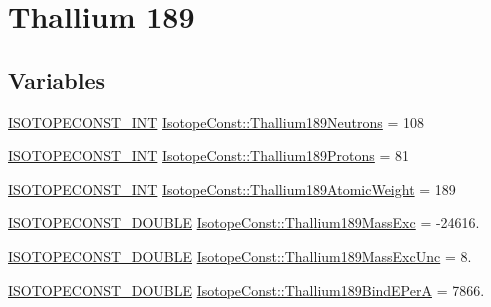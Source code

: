 \hypertarget{group___isotope_const-_thallium-_tl189}{}\section{Thallium 189}
\label{group___isotope_const-_thallium-_tl189}
\subsection*{Variables}
\begin{DoxyCompactItemize}
\item 
\mbox{\hyperlink{group___isotope_const-_macros_ga5f18360b3e99483a35c32d789e62621c}{I\+S\+O\+T\+O\+P\+E\+C\+O\+N\+S\+T\+\_\+\+I\+NT}} \mbox{\hyperlink{group___isotope_const-_thallium-_tl189_ga93f78c740e004d7b0ff4c0933b0ea2aa}{Isotope\+Const\+::\+Thallium189\+Neutrons}} = 108
\item 
\mbox{\hyperlink{group___isotope_const-_macros_ga5f18360b3e99483a35c32d789e62621c}{I\+S\+O\+T\+O\+P\+E\+C\+O\+N\+S\+T\+\_\+\+I\+NT}} \mbox{\hyperlink{group___isotope_const-_thallium-_tl189_ga1773d83e0088883eaefddce29a97cbbf}{Isotope\+Const\+::\+Thallium189\+Protons}} = 81
\item 
\mbox{\hyperlink{group___isotope_const-_macros_ga5f18360b3e99483a35c32d789e62621c}{I\+S\+O\+T\+O\+P\+E\+C\+O\+N\+S\+T\+\_\+\+I\+NT}} \mbox{\hyperlink{group___isotope_const-_thallium-_tl189_gac244129f53e660802eeed8c60e631203}{Isotope\+Const\+::\+Thallium189\+Atomic\+Weight}} = 189
\item 
\mbox{\hyperlink{group___isotope_const-_macros_ga8f45a7272ce02c0b4c65c44636ed719a}{I\+S\+O\+T\+O\+P\+E\+C\+O\+N\+S\+T\+\_\+\+D\+O\+U\+B\+LE}} \mbox{\hyperlink{group___isotope_const-_thallium-_tl189_ga1e8c0b94bb70b954f89870225df2fbbf}{Isotope\+Const\+::\+Thallium189\+Mass\+Exc}} = -\/24616.
\item 
\mbox{\hyperlink{group___isotope_const-_macros_ga8f45a7272ce02c0b4c65c44636ed719a}{I\+S\+O\+T\+O\+P\+E\+C\+O\+N\+S\+T\+\_\+\+D\+O\+U\+B\+LE}} \mbox{\hyperlink{group___isotope_const-_thallium-_tl189_ga25afccf72c84235295c44cad45a1d4ac}{Isotope\+Const\+::\+Thallium189\+Mass\+Exc\+Unc}} = 8.
\item 
\mbox{\hyperlink{group___isotope_const-_macros_ga8f45a7272ce02c0b4c65c44636ed719a}{I\+S\+O\+T\+O\+P\+E\+C\+O\+N\+S\+T\+\_\+\+D\+O\+U\+B\+LE}} \mbox{\hyperlink{group___isotope_const-_thallium-_tl189_gaa912c8496030c9d92b7fbcc4743f9fd0}{Isotope\+Const\+::\+Thallium189\+Bind\+E\+PerA}} = 7866.
\item 

\end{DoxyCompactItemize}
